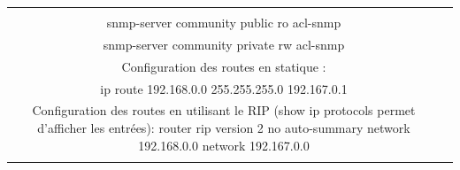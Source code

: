\documentclass[a4paper,11pt]{article}				    %
\begin{document}
{{\begin{tabular}{cc}
{{				!--- RW = lecture et \'ecriture \\
				snmp-server community public ro acl-snmp\\
				snmp-server community private rw acl-snmp
			}\\
			\MbFCmd{1.3cm}
			{Configuration des routes en statique :}
			{
				ip routing\\
				ip route 192.168.0.0 255.255.255.0 192.167.0.1
			}\\
			\MbFCmd{1.8cm}
			{Configuration des routes en utilisant le RIP  (show ip protocols permet d'afficher les entr\'ees):}
			{
				\small
				router rip\vskip-0.15cm
				version 2\vskip-0.15cm
				no auto-summary\vskip-0.15cm
				network 192.168.0.0\vskip-0.15cm
				network 192.167.0.0
			}\\
		}\\
	\end{tabular}
 }
}
\end{document}
